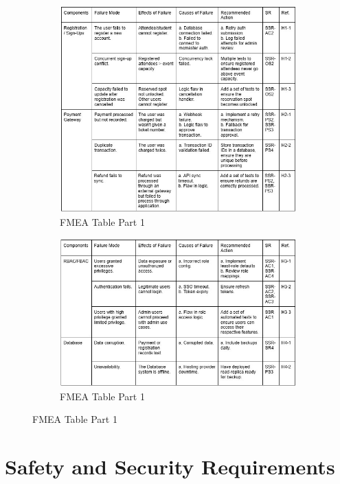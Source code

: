 \documentclass{article}
\begin{document}
\begin{figure}[H]
\begin{subfigure}{\textwidth}
    \centering\includegraphics[width=\textwidth]{part1-register_payment.jpg} 
    \caption{FMEA Table Part 1}
\end{subfigure}

\begin{subfigure}{\textwidth}
    \centering\includegraphics[width=\textwidth]{part2-rbac_db.jpg} 
    \caption{FMEA Table Part 1}
\end{subfigure}

\end{figure}

\section{Safety and Security Requirements}
\end{document}
